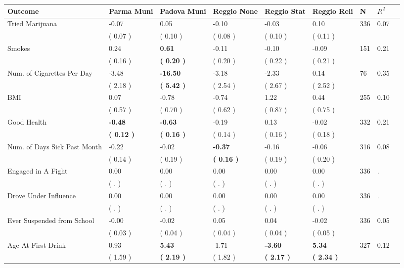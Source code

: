 \begin{tabular}{L{6.2cm} C{1.8cm} C{1.8cm} C{1.8cm} C{1.8cm} C{1.8cm} C{1.8cm} C{0.3cm} C{0.3cm}}
\toprule
 \textbf{Outcome} & \textbf{Parma Muni} & \textbf{Padova Muni} & \textbf{Reggio None} & \textbf{Reggio Stat} & \textbf{Reggio Reli} & \textbf{N} & \textbf{$ R^2$} \\
\midrule
Tried Marijuana &     -0.07 &      0.05 &     -0.10 &     -0.03 &      0.10  & 336 &       0.07 \\ 
 & (     0.07 ) & (     0.10 ) & (     0.08 ) & (     0.10 ) & (     0.11 )  & \\
Smokes &      0.24 & \textbf{     0.61} &     -0.11 &     -0.10 &     -0.09  & 151 &       0.21 \\ 
 & (     0.16 ) & \textbf{(     0.20 )} & (     0.20 ) & (     0.22 ) & (     0.21 )  & \\
Num. of Cigarettes Per Day &     -3.48 & \textbf{   -16.50} &     -3.18 &     -2.33 &      0.14  & 76 &       0.35 \\ 
 & (     2.18 ) & \textbf{(     5.42 )} & (     2.54 ) & (     2.67 ) & (     2.52 )  & \\
BMI &      0.07 &     -0.78 &     -0.74 &      1.22 &      0.44  & 255 &       0.10 \\ 
 & (     0.57 ) & (     0.70 ) & (     0.62 ) & (     0.87 ) & (     0.75 )  & \\
Good Health & \textbf{    -0.48} & \textbf{    -0.63} &     -0.19 &      0.13 &     -0.02  & 332 &       0.21 \\ 
 & \textbf{(     0.12 )} & \textbf{(     0.16 )} & (     0.14 ) & (     0.16 ) & (     0.18 )  & \\
Num. of Days Sick Past Month &     -0.22 &     -0.02 & \textbf{    -0.37} &     -0.16 &     -0.06  & 316 &       0.08 \\ 
 & (     0.14 ) & (     0.19 ) & \textbf{(     0.16 )} & (     0.19 ) & (     0.20 )  & \\
Engaged in A Fight &      0.00 &      0.00 &      0.00 &      0.00 &      0.00  & 336 &          . \\ 
 & (        . ) & (        . ) & (        . ) & (        . ) & (        . )  & \\
Drove Under Influence &      0.00 &      0.00 &      0.00 &      0.00 &      0.00  & 336 &          . \\ 
 & (        . ) & (        . ) & (        . ) & (        . ) & (        . )  & \\
Ever Suspended from School &     -0.00 &     -0.02 &      0.05 &      0.04 &     -0.02  & 336 &       0.05 \\ 
 & (     0.03 ) & (     0.04 ) & (     0.04 ) & (     0.04 ) & (     0.05 )  & \\
Age At First Drink &      0.93 & \textbf{     5.43} &     -1.71 & \textbf{    -3.60} & \textbf{     5.34}  & 327 &       0.12 \\ 
 & (     1.59 ) & \textbf{(     2.19 )} & (     1.82 ) & \textbf{(     2.17 )} & \textbf{(     2.34 )}  & \\
\bottomrule
\end{tabular}
